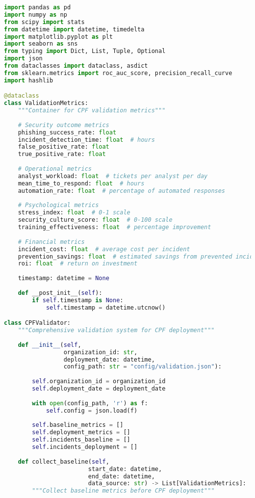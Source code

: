 \documentclass[11pt,a4paper]{article}
\begin{document}
\begin{lstlisting}[language=Python, caption=CPF Validation Framework]
import pandas as pd
import numpy as np
from scipy import stats
from datetime import datetime, timedelta
import matplotlib.pyplot as plt
import seaborn as sns
from typing import Dict, List, Tuple, Optional
import json
from dataclasses import dataclass, asdict
from sklearn.metrics import roc_auc_score, precision_recall_curve
import hashlib

@dataclass
class ValidationMetrics:
    """Container for CPF validation metrics"""
    
    # Security outcome metrics
    phishing_success_rate: float
    incident_detection_time: float  # hours
    false_positive_rate: float
    true_positive_rate: float
    
    # Operational metrics
    analyst_workload: float  # tickets per analyst per day
    mean_time_to_respond: float  # hours
    automation_rate: float  # percentage of automated responses
    
    # Psychological metrics
    stress_index: float  # 0-1 scale
    security_culture_score: float  # 0-100 scale
    training_effectiveness: float  # percentage improvement
    
    # Financial metrics
    incident_cost: float  # average cost per incident
    prevention_savings: float  # estimated savings from prevented incidents
    roi: float  # return on investment
    
    timestamp: datetime = None
    
    def __post_init__(self):
        if self.timestamp is None:
            self.timestamp = datetime.utcnow()

class CPFValidator:
    """Comprehensive validation system for CPF deployment"""
    
    def __init__(self, 
                 organization_id: str,
                 deployment_date: datetime,
                 config_path: str = "config/validation.json"):
        
        self.organization_id = organization_id
        self.deployment_date = deployment_date
        
        with open(config_path, 'r') as f:
            self.config = json.load(f)
        
        self.baseline_metrics = []
        self.deployment_metrics = []
        self.incidents_baseline = []
        self.incidents_deployment = []
        
    def collect_baseline(self, 
                        start_date: datetime,
                        end_date: datetime,
                        data_source: str) -> List[ValidationMetrics]:
        """Collect baseline metrics before CPF deployment"""
        

\end{lstlisting}
\end{document}
